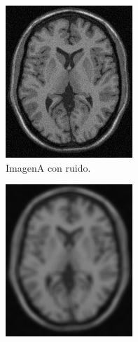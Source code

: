 \documentclass[letterpaper,12pt]{article}
\theoremstyle{plain}
\begin{document}
\begin{figure}[h]
\begin{subfigure}[h]{0.32\linewidth}
            \includegraphics[width=\textwidth]{Figuras/ImagenA_noise=5.png}
            \caption{ImagenA con ruido.} 
         \end{subfigure}
         \begin{subfigure}[h]{0.32\linewidth}
            \centering
            \includegraphics[width=\textwidth]{Figuras/ImagenA_noise=5_filter_7x7.png}

\end{subfigure}
\end{figure}
\end{document}
